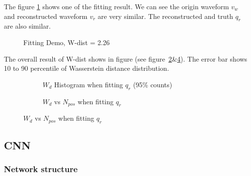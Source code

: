 The figure \ref{fig:fitting} shows one of the fitting result. We can see the origin waveform $v_{w}$ and reconstructed waveform $v_{r}$ are very similar. The reconstructed and truth $q_{r}$ are also similar. 
\begin{figure}[H]
    \centering
    \scalebox{0.4}{}
    \caption{\label{fig:fitting} Fitting Demo, W-dist = 2.26}
\end{figure}

The overall result of W-dist shows in figure (see figure~\ref{fig:fitting-hist}\&\ref{fig:fitting-npos}). The error bar shows 10 to 90 percentile of Wasserstein distance distribution. 

\begin{figure}[H]
\begin{minipage}[b]{.5\textwidth}
\begin{figure}[H]
    \centering
    \resizebox{\textwidth}{!}{}
    \caption{\label{fig:fitting-hist} $W_{d}$ Histogram when fitting $q_{r}$ (95\% counts)}
\end{figure}
\end{minipage}
\begin{minipage}[b]{.5\textwidth}
\begin{figure}[H]
    \centering
    \resizebox{\textwidth}{!}{}
    \caption{\label{fig:fitting-npos} $W_{d}$ vs $N_{pos}$ when fitting $q_{r}$}
\end{figure}
\end{minipage}
\end{figure}

\subsection{CNN}

\subsubsection{Network structure}

